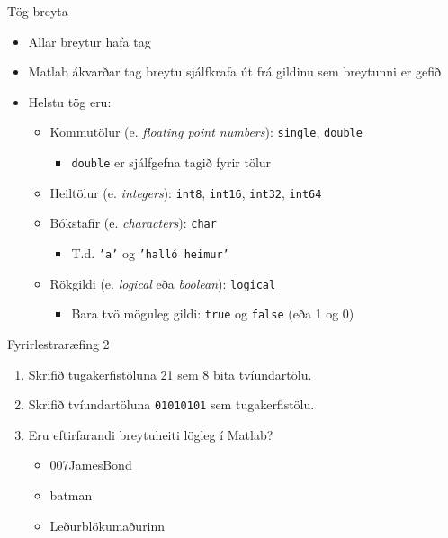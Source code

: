 \documentclass[handout]{beamer}
\begin{document}
\begin{frame}{Tög breyta}
\begin{itemize}
 \item Allar breytur hafa tag
 \item Matlab ákvarðar tag breytu sjálfkrafa út frá gildinu sem breytunni er gefið
 \item Helstu tög eru:
 \begin{itemize}
  \item Kommutölur (e. \emph{floating point numbers}):  \texttt{single}, \texttt{double}
  \begin{itemize}
   \item \texttt{double} er sjálfgefna tagið fyrir tölur
  \end{itemize}
  \item Heiltölur (e. \emph{integers}): \texttt{int8}, \texttt{int16}, \texttt{int32}, \texttt{int64}
  \item Bókstafir (e. \emph{characters}): \texttt{char}
  \begin{itemize}
   \item T.d. \texttt{'a'} og \texttt{'halló heimur'}
  \end{itemize}
  \item Rökgildi (e. \emph{logical} eða \emph{boolean}): \texttt{logical}
  \begin{itemize}
   \item Bara tvö möguleg gildi: \texttt{true} og \texttt{false} (eða 1 og 0)
  \end{itemize}
 \end{itemize}
\end{itemize}
\end{frame}

\begin{frame}{Fyrirlestraræfing 2}
\begin{enumerate}
 \item Skrifið tugakerfistöluna 21 sem 8 bita tvíundartölu.
 \item Skrifið tvíundartöluna \texttt{01010101} sem tugakerfistölu.
 \item Eru eftirfarandi breytuheiti lögleg í Matlab?
 \begin{itemize}
  \item 007JamesBond
  \item batman
  \item Leðurblökumaðurinn
 \end{itemize}
\end{enumerate}
\end{frame}
\end{document}
